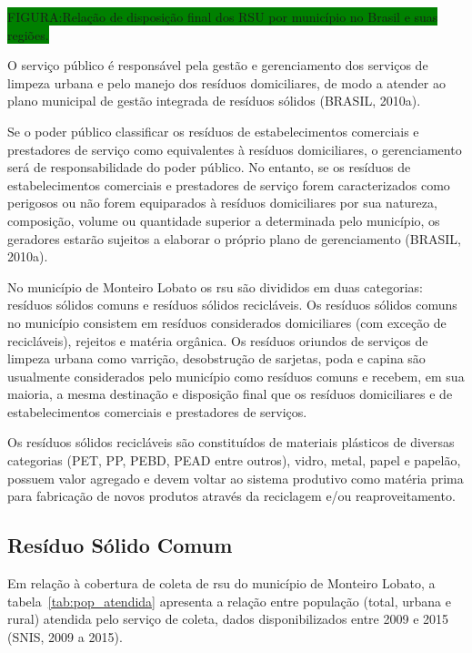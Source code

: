	\colorbox{green}{FIGURA:Relação de disposição final dos RSU por município no Brasil e suas regiões.}
	
	O serviço público é responsável pela gestão e gerenciamento dos serviços de limpeza urbana e pelo manejo dos resíduos domiciliares, de modo a atender ao plano municipal de gestão integrada de resíduos sólidos (BRASIL, 2010a).
	
	Se o poder público classificar os resíduos de estabelecimentos comerciais e prestadores de serviço como equivalentes à resíduos domiciliares, o gerenciamento será de responsabilidade do poder público. No entanto, se os resíduos de estabelecimentos comerciais e prestadores de serviço forem caracterizados como perigosos ou não forem equiparados à resíduos domiciliares por sua natureza, composição, volume ou quantidade superior a determinada pelo município, os geradores estarão sujeitos a elaborar o próprio plano de gerenciamento (BRASIL, 2010a).
	
	No município de Monteiro Lobato os \gls{rsu} são divididos em duas categorias: resíduos sólidos comuns e resíduos sólidos recicláveis. Os resíduos sólidos comuns no município consistem em resíduos considerados domiciliares (com exceção de recicláveis), rejeitos e matéria orgânica. 
	Os resíduos oriundos de serviços de limpeza urbana como varrição, desobstrução de sarjetas, poda e capina são usualmente considerados pelo município como resíduos comuns e recebem, em sua maioria, a mesma destinação e disposição final que os resíduos domiciliares e de estabelecimentos comerciais e prestadores de serviços.
	
	Os resíduos sólidos recicláveis são constituídos de materiais plásticos de diversas categorias (PET, PP, PEBD, PEAD entre outros), vidro, metal, papel e papelão, possuem valor agregado e devem voltar ao sistema produtivo como matéria prima para fabricação de novos produtos através da reciclagem e/ou reaproveitamento.
	
	\subsection{Resíduo Sólido Comum}
	
	Em relação à cobertura de coleta de \gls{rsu} do município de Monteiro Lobato, a tabela~\ref{tab:pop_atendida} apresenta a relação entre população (total, urbana e rural) atendida pelo serviço de coleta, dados disponibilizados entre 2009 e 2015 (SNIS, 2009 a 2015).
	
	
	
